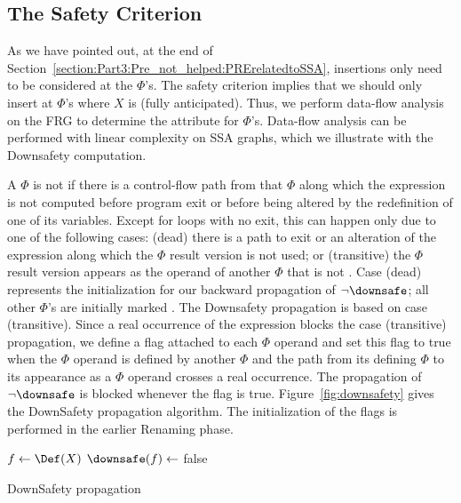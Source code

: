 \subsection{The Safety Criterion}

As we have pointed out, at the end of Section~\ref{section:Part3:Pre_not_helped:PRErelatedtoSSA}, insertions only need to be considered at the $\Phi$'s. 
The safety criterion implies that we should only insert at $\Phi$'s where $X$ is \downsafe (fully anticipated). 
Thus, we perform data-flow analysis on the FRG to determine the \downsafe attribute for $\Phi$'s. 
Data-flow analysis can be performed with linear complexity on SSA graphs, which we illustrate with the Downsafety computation.

A $\Phi$ is not \downsafe{} if there is a control-flow path from that $\Phi$ along which the expression is not computed before program exit or before being altered by the redefinition of one of its variables. 
Except for loops with no exit, this can happen only due to one of the following cases: 
(dead) there is a path to exit or an alteration of the expression along which the $\Phi$ result version is not used; 
or (transitive) the $\Phi$ result version appears as the operand of another $\Phi$ that is not \downsafe. 
Case (dead) represents the initialization for our backward propagation of $\neg \downsafe$; 
all other $\Phi$'s are initially marked \downsafe. 
The Downsafety propagation is based on case (transitive). 
Since a real occurrence of the expression blocks the case (transitive) propagation, we define a \hasrealuse flag attached to each $\Phi$ operand and set this flag to true when the $\Phi$ operand is defined by another $\Phi$ and the path from its defining $\Phi$ to its appearance as a $\Phi$ operand crosses a real occurrence. 
The propagation of $\neg \downsafe$ is blocked whenever the \hasrealuse flag is true. 
Figure~\ref{fig:downsafety} gives the DownSafety propagation algorithm. 
The initialization of the \hasrealuse flags is performed in the earlier Renaming phase.

\begin{algorithm}
  \LinesNumbered
{
}
\vspace{1em}
       {
  $f \gets \Def(X)$\;
  $\downsafe(f) \leftarrow$ false\;
}

\caption{DownSafety propagation}
\label{fig:downsafety}
\end{algorithm}

